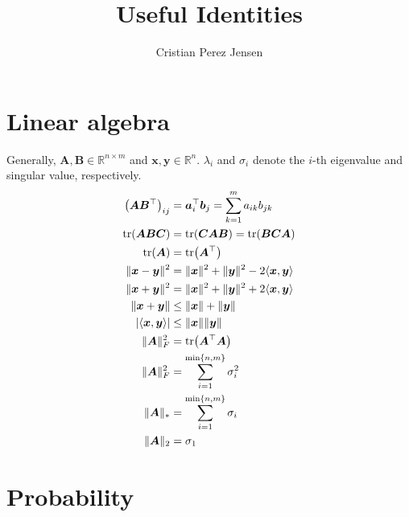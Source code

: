 \documentclass[a4paper]{article}
\title{\textsf{\textbf{Useful Identities}}}
\author{\textsf{Cristian Perez Jensen}}
\date{}
\newcommand{\lft}{\mathopen{}\mathclose\bgroup\left}
\newcommand{\rgt}{\aftergroup\egroup\right}
\newcommand{\R}{\mathbb{R}}
\renewcommand{\vec}[1]{\bm{#1}}
\newcommand{\mat}[1]{\bm{#1}}
\newcommand{\transpose}[1]{#1^\top}
\newcommand{\trace}[1]{\mathrm{tr}\lft(#1\rgt)}
\begin{document}
\maketitle

\section*{\textsf{Linear algebra}}

Generally, $\mat{A}, \mat{B} \in \R^{n \times m}$ and $\vec{x}, \vec{y} \in \R^n$. $\lambda_i$ and
$\sigma_i$ denote the $i$-th eigenvalue and singular value, respectively.
\begin{align*}
    \lft( \mat{A} \transpose{\mat{B}} \rgt)_{ij} & = \transpose{\vec{a}}_i \vec{b}_j = \sum_{k=1}^{m} a_{ik} b_{jk}        \\
    \trace{\mat{A} \mat{B} \mat{C}}              & = \trace{\mat{C} \mat{A} \mat{B}} = \trace{\mat{B} \mat{C} \mat{A}}     \\
    \trace{\mat{A}}                              & = \trace{\transpose{\mat{A}}}                                           \\
    \| \vec{x} - \vec{y} \|^2                    & = \| \vec{x} \|^2 + \| \vec{y} \|^2 - 2\langle \vec{x}, \vec{y} \rangle \\
    \| \vec{x} + \vec{y} \|^2                    & = \| \vec{x} \|^2 + \| \vec{y} \|^2 + 2\langle \vec{x}, \vec{y} \rangle \\
    \| \vec{x} + \vec{y} \|                      & \leq \| \vec{x} \| + \| \vec{y} \|                                      \\
    | \langle \vec{x}, \vec{y} \rangle |         & \leq \| \vec{x} \| \| \vec{y} \|                                        \\
    \| \mat{A} \|_F^2                            & = \trace{\transpose{\mat{A}} \mat{A}}                                   \\
    \| \mat{A} \|_F^2                            & = \sum_{i=1}^{\min \{ n, m \}} \sigma_i^2                               \\
    \| \mat{A} \|_*                              & = \sum_{i=1}^{\min \{ n, m \}} \sigma_i                                 \\
    \| \mat{A} \|_2                              & = \sigma_1                                                              \\
\end{align*}

\section*{\textsf{Probability}}
\end{document}
